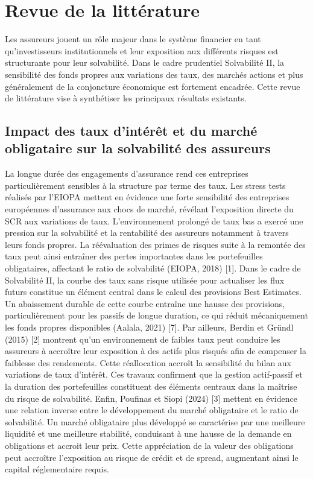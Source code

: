 \documentclass[
]{article}
\begin{document}
\section{Revue de la littérature}\label{revue-de-la-littuxe9rature}

Les assureurs jouent un rôle majeur dans le système financier en tant
qu'investisseurs institutionnels et leur exposition aux différents
risques est structurante pour leur solvabilité. Dans le cadre prudentiel
Solvabilité II, la sensibilité des fonds propres aux variations des
taux, des marchés actions et plus généralement de la conjoncture
économique est fortement encadrée. Cette revue de littérature vise à
synthétiser les principaux résultats existants.

\subsection{Impact des taux d'intérêt et du marché obligataire sur la
solvabilité des
assureurs}\label{impact-des-taux-dintuxe9ruxeat-et-du-marchuxe9-obligataire-sur-la-solvabilituxe9-des-assureurs}

La longue durée des engagements d'assurance rend ces entreprises
particulièrement sensibles à la structure par terme des taux. Les stress
tests réalisés par l'EIOPA mettent en évidence une forte sensibilité des
entreprises européennes d'assurance aux chocs de marché, révélant
l'exposition directe du SCR aux variations de taux. L'environnement
prolongé de taux bas a exercé une pression sur la solvabilité et la
rentabilité des assureurs notamment à travers leurs fonds propres. La
réévaluation des primes de risques suite à la remontée des taux peut
ainsi entraîner des pertes importantes dans les portefeuilles
obligataires, affectant le ratio de solvabilité (EIOPA, 2018) {[}1{]}.
Dans le cadre de Solvabilité II, la courbe des taux sans risque utilisée
pour actualiser les flux futurs constitue un élément central dans le
calcul des provisions Best Estimates. Un abaissement durable de cette
courbe entraîne une hausse des provisions, particulièrement pour les
passifs de longue duration, ce qui réduit mécaniquement les fonds
propres disponibles (Aalala, 2021) {[}7{]}. Par ailleurs, Berdin et
Gründl (2015) {[}2{]} montrent qu'un environnement de faibles taux peut
conduire les assureurs à accroître leur exposition à des actifs plus
risqués afin de compenser la faiblesse des rendements. Cette
réallocation accroît la sensibilité du bilan aux variations de taux
d'intérêt. Ces travaux confirment que la gestion actif-passif et la
duration des portefeuilles constituent des éléments centraux dans la
maîtrise du risque de solvabilité. Enfin, Poufinas et Siopi (2024)
{[}3{]} mettent en évidence une relation inverse entre le développement
du marché obligataire et le ratio de solvabilité. Un marché obligataire
plus développé se caractérise par une meilleure liquidité et une
meilleure stabilité, conduisant à une hausse de la demande en
obligations et accroit leur prix. Cette appréciation de la valeur des
obligations peut accroître l'exposition au risque de crédit et de
spread, augmentant ainsi le capital réglementaire requis.
\end{document}
